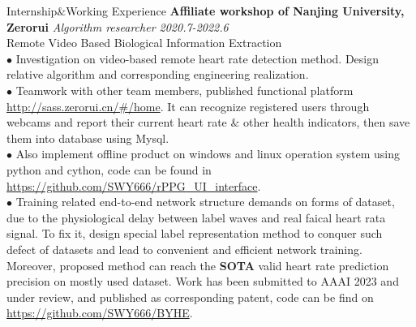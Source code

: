 \documentclass{resume} %
\begin{document}
\begin{rSection}{Internship$\&$Working Experience}
    {\bf Affiliate workshop of Nanjing University, Zerorui} \hfill {\em Algorithm researcher 2020.7-2022.6} \\
    Remote Video Based Biological Information Extraction \\
    {$\bullet$ Investigation on video-based remote heart rate detection method. Design relative algorithm and corresponding engineering realization. \\
    $\bullet$ Teamwork with other team members, published functional platform \url{http://sass.zerorui.cn/#/home}. It can recognize registered users through webcams and report their current heart rate $\&$ other health indicators, then save them into database using Mysql. \\
    $\bullet$ Also implement offline product on windows and linux operation system using python and cython, code can be found in \url{https://github.com/SWY666/rPPG_UI_interface}. \\
    $\bullet$ Training related end-to-end network structure demands on forms of dataset, due to the physiological delay between label waves and real faical heart rata signal. To fix it, design special label representation method to conquer such defect of datasets and lead to convenient and efficient network training. Moreover, proposed method can reach the \textbf{SOTA} valid heart rate prediction precision on mostly used dataset. Work has been submitted to AAAI 2023 and under review, and published as corresponding patent, code can be find on \url{https://github.com/SWY666/BYHE}.}
\end{rSection}
\end{document}
